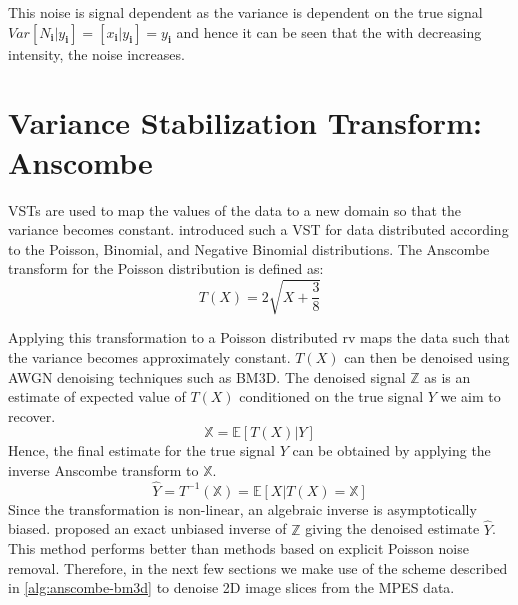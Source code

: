 This noise is signal dependent as the variance is dependent on the true signal  $Var[N_{\mathbf{i}} | y_{\mathbf{i}}] = [x_{\mathbf{i}} | y_{\mathbf{i}}] = y_{\mathbf{i}}$ and hence it can be seen that the with decreasing intensity, the noise increases.

\section{Variance Stabilization Transform: Anscombe}

\Glspl{VST} are used to map the values of the data to a new domain so that the variance becomes constant. \citeauthor{anscombeTransformationPoissonBinomial1948} \cite{anscombeTransformationPoissonBinomial1948} introduced such a \gls{VST} for data distributed according to the Poisson, Binomial, and Negative Binomial distributions. The Anscombe transform for the Poisson distribution is defined as:
\begin{equation}
    T(X) = 2 \sqrt{X + \frac{3}{8}}
\end{equation}

Applying this transformation to a Poisson distributed \gls{rv} maps the data such that the variance becomes approximately constant. $T(X)$ can then be denoised using \gls{AWGN} denoising techniques such as \gls{BM3D}. 
The denoised signal $\mathbb{Z}$ as is an estimate of expected value of $T(X)$ conditioned on the true signal $Y$ we aim to recover.
\begin{equation}
    \mathbb{X} = \mathbb{E}[T(X) | Y]
\end{equation}
Hence, the final estimate for the true signal $Y$ can be obtained by applying the inverse Anscombe transform to $\mathbb{X}$.
\begin{equation}
    \hat{Y} = T^{-1}(\mathbb{X}) = \mathbb{E}[X | T(X) = \mathbb{X}]
\end{equation}
Since the transformation is non-linear, an algebraic inverse is asymptotically biased. \citeauthor{makitaloOptimalInversionAnscombe2011} \cite{makitaloOptimalInversionAnscombe2011} proposed an exact unbiased inverse of $\mathbb{Z}$ giving the denoised estimate $\hat{Y}$. This method performs better than methods based on explicit Poisson noise removal. Therefore, in the next few sections we make use of the scheme described in \cref{alg:anscombe-bm3d} to denoise 2D image slices from the \gls{MPES} data.


